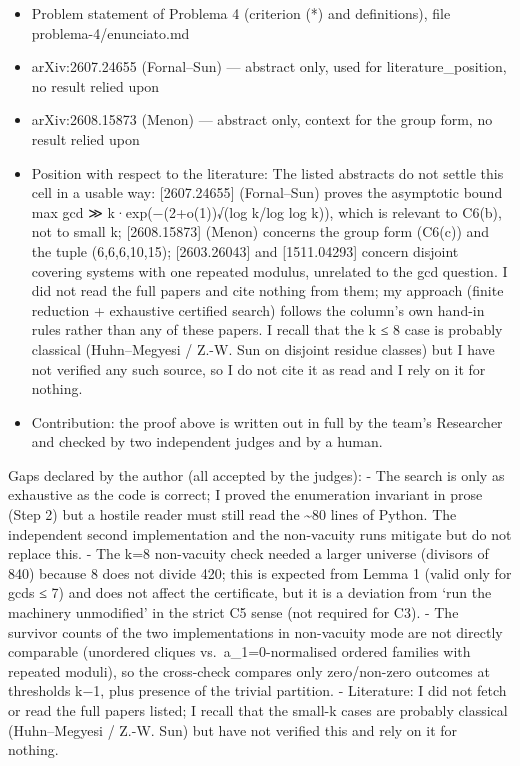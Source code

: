 \begin{itemize}
\tightlist
\item
  Problem statement of Problema 4 (criterion (*) and definitions), file
  problema-4/enunciato.md
\item
  arXiv:2607.24655 (Fornal--Sun) --- abstract only, used for
  literature\_position, no result relied upon
\item
  arXiv:2608.15873 (Menon) --- abstract only, context for the group
  form, no result relied upon
\item
  Position with respect to the literature: The listed abstracts do not
  settle this cell in a usable way: {[}2607.24655{]} (Fornal--Sun)
  proves the asymptotic bound max gcd ≫ k·exp(−(2+o(1))√(log k/log log
  k)), which is relevant to C6(b), not to small k; {[}2608.15873{]}
  (Menon) concerns the group form (C6(c)) and the tuple (6,6,6,10,15);
  {[}2603.26043{]} and {[}1511.04293{]} concern disjoint covering
  systems with one repeated modulus, unrelated to the gcd question. I
  did not read the full papers and cite nothing from them; my approach
  (finite reduction + exhaustive certified search) follows the column's
  own hand-in rules rather than any of these papers. I recall that the k
  ≤ 8 case is probably classical (Huhn--Megyesi / Z.-W. Sun on disjoint
  residue classes) but I have not verified any such source, so I do not
  cite it as read and I rely on it for nothing.
\item
  Contribution: the proof above is written out in full by the team's
  Researcher and checked by two independent judges and by a human.
\end{itemize}


Gaps declared by the author (all accepted by the judges): - The search
is only as exhaustive as the code is correct; I proved the enumeration
invariant in prose (Step 2) but a hostile reader must still read the
\textasciitilde80 lines of Python. The independent second implementation
and the non-vacuity runs mitigate but do not replace this. - The k=8
non-vacuity check needed a larger universe (divisors of 840) because 8
does not divide 420; this is expected from Lemma 1 (valid only for gcds
≤ 7) and does not affect the certificate, but it is a deviation from
`run the machinery unmodified' in the strict C5 sense (not required for
C3). - The survivor counts of the two implementations in non-vacuity
mode are not directly comparable (unordered cliques
vs.~a\_1=0-normalised ordered families with repeated moduli), so the
cross-check compares only zero/non-zero outcomes at thresholds k−1, plus
presence of the trivial partition. - Literature: I did not fetch or read
the full papers listed; I recall that the small-k cases are probably
classical (Huhn--Megyesi / Z.-W. Sun) but have not verified this and
rely on it for nothing.

